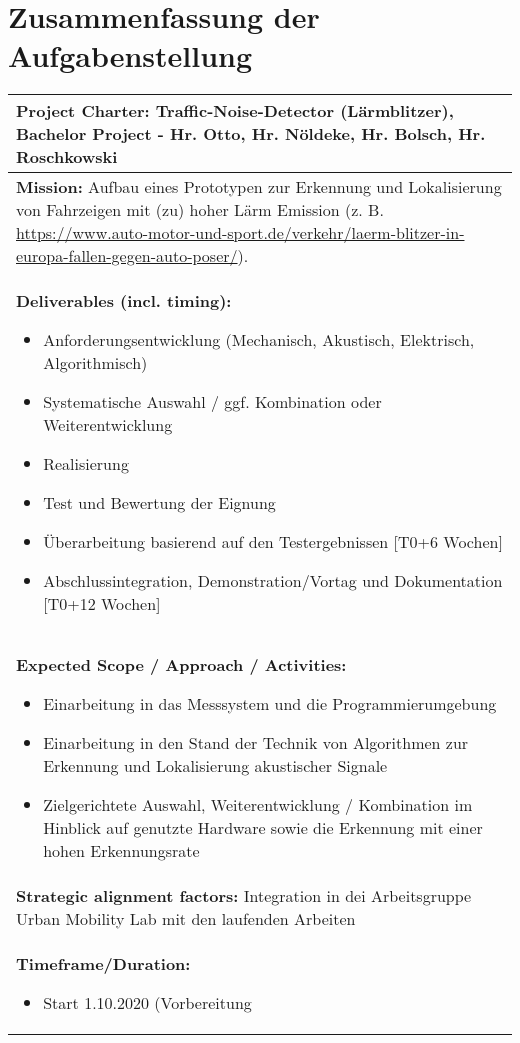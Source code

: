 \section{Zusammenfassung der Aufgabenstellung}

\begin{tabular}{|p{15cm}|}
\hline
\textbf{Project Charter:} Traffic-Noise-Detector (Lärmblitzer), Bachelor Project - Hr. Otto, Hr. Nöldeke, Hr. Bolsch, Hr. Roschkowski\\
\hline
\textbf{Mission:} Aufbau eines Prototypen zur Erkennung und Lokalisierung von Fahrzeigen mit (zu) hoher Lärm Emission (z. B. \url{https://www.auto-motor-und-sport.de/verkehr/laerm-blitzer-in-europa-fallen-gegen-auto-poser/}).\\
\hline
\textbf{Deliverables (incl. timing):}
\begin{itemize}
\item Anforderungsentwicklung (Mechanisch, Akustisch, Elektrisch, Algorithmisch)
\item Systematische Auswahl / ggf. Kombination oder Weiterentwicklung
\item Realisierung
\item Test und Bewertung der Eignung
\item Überarbeitung basierend auf den Testergebnissen [T0+6 Wochen]
\item Abschlussintegration, Demonstration/Vortag und Dokumentation [T0+12 Wochen]
\end{itemize}\\
\hline
\textbf{Expected Scope / Approach / Activities:}
\begin{itemize}
\item Einarbeitung in das Messsystem und die Programmierumgebung
\item Einarbeitung in den Stand der Technik von Algorithmen zur Erkennung und Lokalisierung akustischer Signale
\item Zielgerichtete Auswahl, Weiterentwicklung / Kombination im Hinblick auf genutzte Hardware sowie die Erkennung mit einer hohen Erkennungsrate
\end{itemize}\\
\hline
\textbf{Strategic alignment factors:}
\newline
Integration in dei Arbeitsgruppe Urban Mobility Lab mit den laufenden Arbeiten\\
\hline
\textbf{Timeframe/Duration:}
\begin{itemize}
\item Start 1.10.2020 (Vorbereitung

\end{itemize}
\end{tabular}
